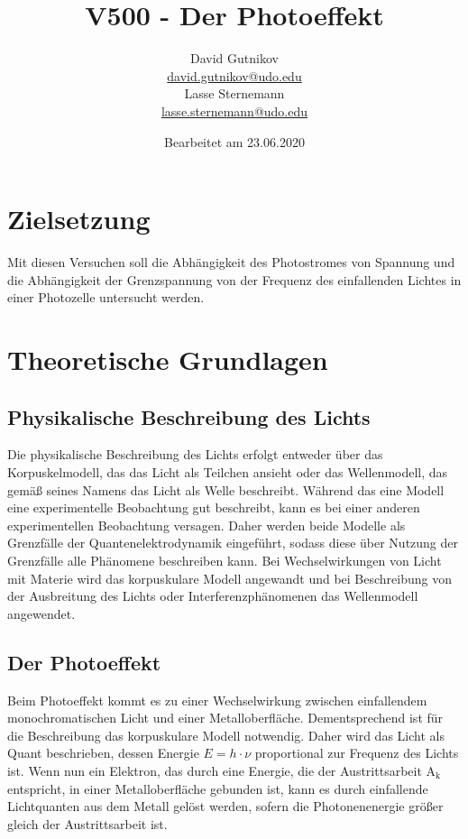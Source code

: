 \documentclass[titlepage = firstcover]{scrartcl}
\title{V500 - Der Photoeffekt}
\author{
  David Gutnikov\\
  \href{mailto:david.gutnikov@udo.edu}{david.gutnikov@udo.edu}\\
  Lasse Sternemann\\
  \href{mailto:lasse.sternemann@udo.edu}{lasse.sternemann@udo.edu}
}
\date{Bearbeitet am 23.06.2020}
\begin{document}
    \maketitle
    \newpage
    \tableofcontents
    \newpage

    \section{Zielsetzung}
        Mit diesen Versuchen soll die Abhängigkeit des Photostromes von Spannung und die Abhängigkeit der Grenzspannung von der Frequenz des einfallenden Lichtes in einer Photozelle untersucht werden.

    \section{Theoretische Grundlagen}
        \subsection{Physikalische Beschreibung des Lichts}
        Die physikalische Beschreibung des Lichts erfolgt entweder über das Korpuskelmodell, das das Licht als Teilchen ansieht oder das Wellenmodell, das gemäß seines Namens das Licht als Welle 
        beschreibt. Während das eine Modell eine experimentelle Beobachtung gut beschreibt, kann es bei einer anderen experimentellen Beobachtung versagen. Daher werden beide Modelle als Grenzfälle
        der Quantenelektrodynamik eingeführt, sodass diese über Nutzung der Grenzfälle alle Phänomene beschreiben kann. Bei Wechselwirkungen von Licht mit Materie wird das korpuskulare Modell 
        angewandt und bei Beschreibung von der Ausbreitung des Lichts oder Interferenzphänomenen das Wellenmodell angewendet.
        
        \subsection{Der Photoeffekt}
        Beim Photoeffekt kommt es zu einer Wechselwirkung zwischen einfallendem monochromatischen Licht und einer Metalloberfläche. Dementsprechend ist für die Beschreibung das korpuskulare Modell 
        notwendig. Daher wird das Licht als Quant beschrieben, dessen Energie $E=h \cdot \nu$ proportional zur Frequenz des Lichts ist. Wenn nun ein Elektron, das durch eine Energie, die der 
        Austrittsarbeit $\text{A}_{\text{k}}$ entspricht, in einer Metalloberfläche gebunden ist, kann es durch einfallende Lichtquanten aus dem Metall gelöst werden, sofern die Photonenenergie größer 
        gleich der Austrittsarbeit ist.
\end{document}

